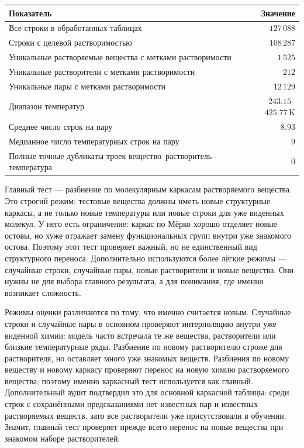 \documentclass[11pt]{article}
\theoremstyle{definition}
\begin{document}
\begin{center}
\small
\begin{tabular}{lr}
\toprule
Показатель & Значение \\
\midrule
Все строки в обработанных таблицах & $127\,088$ \\
Строки с целевой растворимостью & $108\,287$ \\
Уникальные растворяемые вещества с метками растворимости & $1\,525$ \\
Уникальные растворители с метками растворимости & $212$ \\
Уникальные пары с метками растворимости & $12\,129$ \\
Диапазон температур & $243.15$--$425.77\,\mathrm{K}$ \\
Среднее число строк на пару & $8.93$ \\
Медианное число температурных строк на пару & $9$ \\
Полные точные дубликаты троек вещество--растворитель--температура & $0$ \\
\bottomrule
\end{tabular}
\end{center}

Главный тест --- разбиение по молекулярным каркасам растворяемого вещества. Это строгий режим: тестовые вещества должны иметь новые структурные каркасы, а не только новые температуры или новые строки для уже виденных молекул. У него есть ограничение: каркас по Мёрко хорошо отделяет новые остовы, но хуже отражает замену функциональных групп внутри уже знакомого остова. Поэтому этот тест проверяет важный, но не единственный вид структурного переноса. Дополнительно используются более лёгкие режимы --- случайные строки, случайные пары, новые растворители и новые вещества. Они нужны не для выбора главного результата, а для понимания, где именно возникает сложность.

Режимы оценки различаются по тому, что именно считается новым. Случайные строки и случайные пары в основном проверяют интерполяцию внутри уже виденной химии: модель часто встречала те же вещества, растворители или близкие температурные ряды. Разбиение по новому растворителю строже для растворителя, но оставляет много уже знакомых веществ. Разбиения по новому веществу и новому каркасу проверяют перенос на новую химию растворяемого вещества; поэтому именно каркасный тест используется как главный. Дополнительный аудит подтвердил это для основной каркасной таблицы: среди строк с сохранёнными предсказаниями нет известных пар и известных растворяемых веществ, зато все растворители уже присутствовали в обучении. Значит, главный тест проверяет прежде всего перенос на новые вещества при знакомом наборе растворителей.
\end{document}
